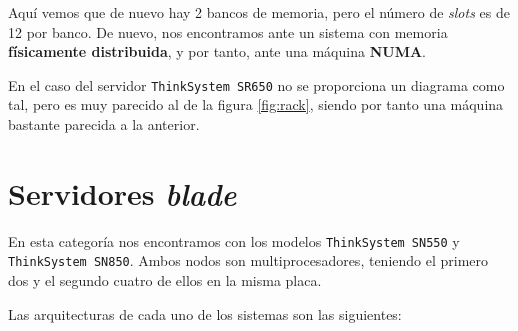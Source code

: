 \documentclass[11pt,a4paper]{article}
\begin{document}
Aquí vemos que de nuevo hay 2 bancos de memoria, pero el número de \textit{slots} es de 12 por
banco. De nuevo, nos encontramos ante un sistema con memoria \textbf{físicamente distribuida},
y por tanto, ante una máquina \textbf{NUMA}.

En el caso del servidor \texttt{ThinkSystem SR650} no se proporciona un diagrama como tal,
pero es muy parecido al de la figura \ref{fig:rack}, siendo por tanto una máquina bastante
parecida a la anterior.


\section{Servidores \textit{blade}}

En esta categoría nos encontramos con los modelos \texttt{ThinkSystem SN550} y
\texttt{ThinkSystem SN850}. Ambos nodos son multiprocesadores, teniendo el primero
dos y el segundo cuatro de ellos en la misma placa.

Las arquitecturas de cada uno de los sistemas son las siguientes:
\end{document}
